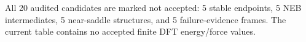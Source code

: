 All 20 audited candidates are marked not accepted: 5 stable endpoints, 5 NEB intermediates, 5 near-saddle structures, and 5 failure-evidence frames. The current table contains no accepted finite DFT energy/force values.
